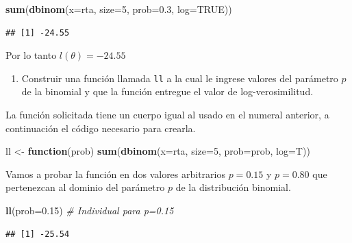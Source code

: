 \documentclass[10pt,]{krantz}
\makeatletter
\newenvironment{Shaded}{\begin{snugshade}}{\end{snugshade}}
\newcommand{\KeywordTok}[1]{\textcolor[rgb]{0.13,0.29,0.53}{\textbf{#1}}}
\newcommand{\DataTypeTok}[1]{\textcolor[rgb]{0.13,0.29,0.53}{#1}}
\newcommand{\DecValTok}[1]{\textcolor[rgb]{0.00,0.00,0.81}{#1}}
\newcommand{\FloatTok}[1]{\textcolor[rgb]{0.00,0.00,0.81}{#1}}
\newcommand{\StringTok}[1]{\textcolor[rgb]{0.31,0.60,0.02}{#1}}
\newcommand{\CommentTok}[1]{\textcolor[rgb]{0.56,0.35,0.01}{\textit{#1}}}
\newcommand{\OtherTok}[1]{\textcolor[rgb]{0.56,0.35,0.01}{#1}}
\newcommand{\ControlFlowTok}[1]{\textcolor[rgb]{0.13,0.29,0.53}{\textbf{#1}}}
\newcommand{\NormalTok}[1]{#1}
\providecommand{\tightlist}{%
  \setlength{\itemsep}{0pt}\setlength{\parskip}{0pt}}
\newenvironment{kframe}{%
\medskip{}
\setlength{\fboxsep}{.8em}
 \def\at@end@of@kframe{}%
 \ifinner\ifhmode%
  \def\at@end@of@kframe{\end{minipage}}%
  \begin{minipage}{\columnwidth}%
 \fi\fi%
 \def\FrameCommand##1{\hskip\@totalleftmargin \hskip-\fboxsep
 \colorbox{shadecolor}{##1}\hskip-\fboxsep
     \hskip-\linewidth \hskip-\@totalleftmargin \hskip\columnwidth}%
 \MakeFramed {\advance\hsize-\width
   \@totalleftmargin\z@ \linewidth\hsize
   \@setminipage}}%
 {\par\unskip\endMakeFramed%
 \at@end@of@kframe}
\renewenvironment{Shaded}{\begin{kframe}}{\end{kframe}}
\makeatother
\begin{document}
\begin{Shaded}
\begin{Highlighting}[]
\KeywordTok{sum}\NormalTok{(}\KeywordTok{dbinom}\NormalTok{(}\DataTypeTok{x=}\NormalTok{rta, }\DataTypeTok{size=}\DecValTok{5}\NormalTok{, }\DataTypeTok{prob=}\FloatTok{0.3}\NormalTok{, }\DataTypeTok{log=}\OtherTok{TRUE}\NormalTok{))}
\end{Highlighting}
\end{Shaded}

\begin{verbatim}
## [1] -24.55
\end{verbatim}

Por lo tanto \(l(\theta)= -24.55\)

\begin{enumerate}
\def\labelenumi{\arabic{enumi})}
\setcounter{enumi}{1}
\tightlist
\item
  Construir una función llamada \texttt{ll} a la cual le ingrese valores
  del parámetro \(p\) de la binomial y que la función entregue el valor
  de log-verosimilitud.
\end{enumerate}

La función solicitada tiene un cuerpo igual al usado en el numeral
anterior, a continuación el código necesario para crearla.

\begin{Shaded}
\begin{Highlighting}[]
\NormalTok{ll <-}\StringTok{ }\ControlFlowTok{function}\NormalTok{(prob) }\KeywordTok{sum}\NormalTok{(}\KeywordTok{dbinom}\NormalTok{(}\DataTypeTok{x=}\NormalTok{rta, }\DataTypeTok{size=}\DecValTok{5}\NormalTok{, }\DataTypeTok{prob=}\NormalTok{prob, }\DataTypeTok{log=}\NormalTok{T))}
\end{Highlighting}
\end{Shaded}

Vamos a probar la función en dos valores arbitrarios \(p=0.15\) y
\(p=0.80\) que pertenezcan al dominio del parámetro \(p\) de la
distribución binomial.

\begin{Shaded}
\begin{Highlighting}[]
\KeywordTok{ll}\NormalTok{(}\DataTypeTok{prob=}\FloatTok{0.15}\NormalTok{)  }\CommentTok{# Individual para p=0.15}
\end{Highlighting}
\end{Shaded}

\begin{verbatim}
## [1] -25.54
\end{verbatim}
\end{document}
